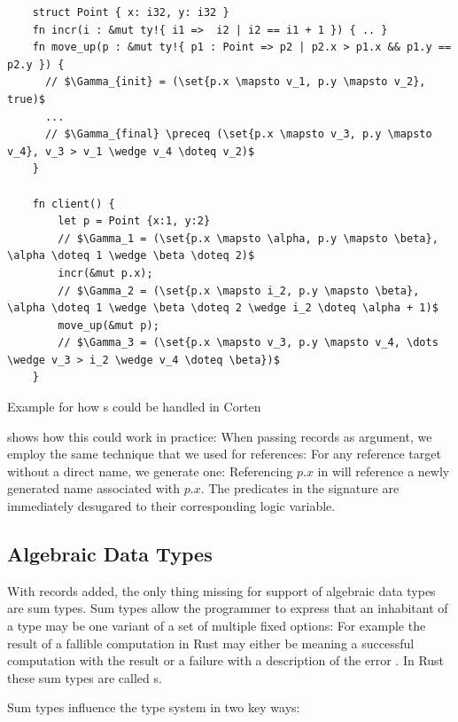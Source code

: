 \documentclass[twoside, english, final]{sdqthesis}
\newcommand{\set}[1]{\left\{ #1 \right\}}
\theoremstyle{definition}
\begin{document}


\begin{listing}[h]
  \begin{verbatim}
    struct Point { x: i32, y: i32 }
    fn incr(i : &mut ty!{ i1 =>  i2 | i2 == i1 + 1 }) { .. }
    fn move_up(p : &mut ty!{ p1 : Point => p2 | p2.x > p1.x && p1.y == p2.y }) {
      // $\Gamma_{init} = (\set{p.x \mapsto v_1, p.y \mapsto v_2}, true)$
      ... 
      // $\Gamma_{final} \preceq (\set{p.x \mapsto v_3, p.y \mapsto v_4}, v_3 > v_1 \wedge v_4 \doteq v_2)$
    }
    
    fn client() {
        let p = Point {x:1, y:2} 
        // $\Gamma_1 = (\set{p.x \mapsto \alpha, p.y \mapsto \beta}, \alpha \doteq 1 \wedge \beta \doteq 2)$
        incr(&mut p.x);
        // $\Gamma_2 = (\set{p.x \mapsto i_2, p.y \mapsto \beta}, \alpha \doteq 1 \wedge \beta \doteq 2 \wedge i_2 \doteq \alpha + 1)$
        move_up(&mut p);
        // $\Gamma_3 = (\set{p.x \mapsto v_3, p.y \mapsto v_4, \dots \wedge v_3 > i_2 \wedge v_4 \doteq \beta})$
    }
  \end{verbatim}
  \caption{Example for how s could be handled in Corten}
  \label{lst:ext-structs}
\end{listing}

 shows how this could work in practice:
When passing records as argument, we employ the same technique that we used for references: For any reference target without a direct name, we generate one: Referencing $p.x$ in  will reference a newly generated name associated with $p.x$. The predicates in the signature are immediately desugared to their corresponding logic variable.

\subsection{Algebraic Data Types}

With records added, the only thing missing for support of algebraic data types are sum types.
Sum types allow the programmer to express that an inhabitant of a type may be one variant of a set of multiple fixed options: For example the result of a fallible computation in Rust may either be  meaning a successful computation with the result  or a failure  with a description of the error .
In Rust these sum types are called s.

Sum types influence the type system in two key ways: 
\end{document}
